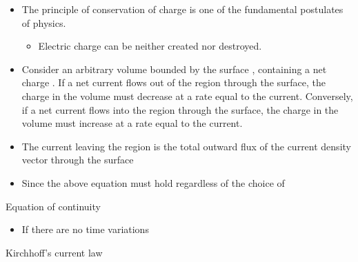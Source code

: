 \begin{ELunit}


\begin{itemize}
\tightlist
\item
  The principle of conservation of charge is one of the fundamental postulates of physics.

  \begin{itemize}
  \tightlist
  \item
    Electric charge can be neither created nor destroyed.
  \end{itemize}
\item
  Consider an arbitrary volume  bounded by the surface , containing a net charge . If a net current  flows out of the region through the surface, the charge in the volume must decrease at a rate equal to the current. Conversely, if a net current flows into the region through the surface, the charge in the volume must increase at a rate equal to the current.
\item
  The current leaving the region is the total outward flux of the current density vector through the surface 
\end{itemize}


\end{ELunit}

\begin{ELjoin}

\begin{itemize}
\tightlist
\item
  Since the above equation must hold regardless of the choice of 
\end{itemize}

\begin{ELimportant}{Equation of continuity}


\end{ELimportant}

\end{ELjoin}

\begin{ELjoin}

\begin{itemize}
\tightlist
\item
  If there are no time variations
\end{itemize}


\begin{ELimportant}{Kirchhoff's current law}


\end{ELimportant}

\end{ELjoin}

